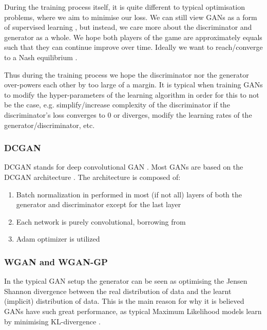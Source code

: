 \documentclass{article}
\begin{document}
During the training process itself, it is quite different to typical
optimisation problems, where we aim to minimise our loss. We can still view GANs 
as a form of supervised learning \cite{goodfellow_nips_2016}, but instead, we
care more about the discriminator and generator as a whole. We hope
both players of the game are approximately equals such that they can
continue improve over time. Ideally we want to reach/converge to a Nash equilibrium \cite{goodfellow_nips_2016}.

Thus during the training process we hope the discriminator nor the generator
over-powers each other by too large of a margin. It is typical when training GANs to modify the hyper-parameters
of the learning algorithm in order for this to not be the case, e.g. simplify/increase complexity of the discriminator
if the discriminator's loss converges to 0 or diverges, modify the learning rates of the generator/discriminator, etc. 

\subsubsection{DCGAN}

DCGAN stands for deep convolutional GAN \cite{radford_unsupervised_2015}. Most GANs are based on the DCGAN architecture \cite{goodfellow_nips_2016}. The architecture is composed of:

\begin{enumerate} 
    \item Batch normalization in performed in most (if not all) layers of both the generator and discriminator except for the last layer
    \item Each network is purely convolutional, borrowing from \cite{springenberg_striving_2014}
    \item Adam optimizer is utilized
\end{enumerate}

\subsubsection{WGAN and WGAN-GP}

In the typical GAN setup the generator can be seen as optimising the Jensen Shannon divergence between 
the real distribution of data and the learnt (implicit) distribution of data. This is the main reason for why
it is believed GANs have such great performance, as typical Maximum Likelihood models learn by minimising 
KL-divergence \cite{goodfellow_nips_2016}.
\end{document}
